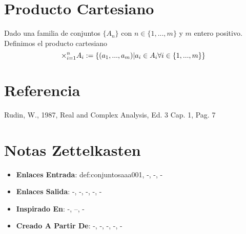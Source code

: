 \documentclass[12pt]{article}
\begin{document}
\section*{Producto Cartesiano}

\begin{definition}
Dado una familia de conjuntos $\{A_{n}\}$ con $n \in \{1,...,m\}$ y $m$ entero positivo. Definimos el producto cartesiano
\[ {\Large\times\normalsize}_{i=1}^{n}A_{i} :=\{(a_{1},...,a_{m}) | a_{i} \in A_{i} \forall i \in \{1,...,m\} \} \]
\end{definition}

\section*{Referencia}
Rudin, W., 1987, Real and Complex Analysis, Ed. 3 Cap. 1, Pag. 7 

\section*{Notas Zettelkasten}
\begin{itemize}
  \item \textbf{Enlaces Entrada}: def:conjuntosaaa001, -, -, -
  \item \textbf{Enlaces Salida}: -, -, -, -, -
  \item \textbf{Inspirado En}: -, --, -
  \item \textbf{Creado A Partir De}: -, -, -, -, -
\end{itemize}
\end{document}
